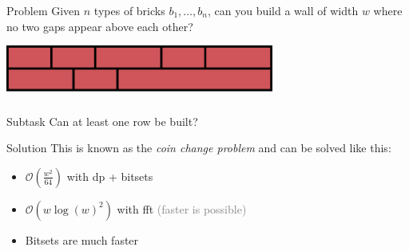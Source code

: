 \begin{frame}
	\frametitle{\problemtitle}
	\bigskip
	\bigskip
	\begin{block}{Problem}
		Given $n$ types of bricks $b_1,\dots,b_n$, can you build a wall of width $w$ where no two gaps appear above each other?
	\end{block}
	\bigskip
	\bigskip
	\bigskip
	\centering
	\includegraphics[width=0.66\textwidth]{sample}
\end{frame}

\begin{frame}
	\frametitle{\problemtitle}
	\begin{block}{Subtask}
		Can at least one row be built?
	\end{block}
	\pause
	\begin{block}{Solution}
		This is known as the \emph{coin change problem} and can be solved like this:
		\begin{itemize}
			\item $\mathcal{O}(\frac{w^2}{64})$ with dp + bitsets
			\item $\mathcal{O}(w\log(w)^2)$ with fft \quad\textcolor{gray}{(faster is possible)}
			\pause
			\smallskip
			\item Bitsets are much faster
		\end{itemize}
	\end{block}

\end{frame}

